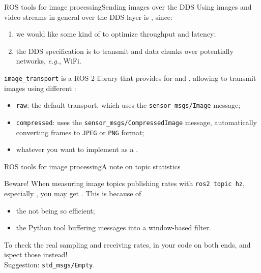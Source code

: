 \begin{frame}{ROS tools for image processing}{Sending images over the DDS}
  Using images and video streams in general over the DDS layer is , since:
  \begin{enumerate}
    \item we would like some kind of  to optimize throughput and latency;
    \item the DDS specification is  to transmit  and  data chunks over potentially  networks, \emph{e.g.}, WiFi.
  \end{enumerate}
  \texttt{image\_transport} is a ROS 2 library that provides  for  and , allowing to transmit images using different :
  \begin{itemize}
    \item \texttt{raw}: the default transport, which uses the \texttt{sensor\_msgs/Image} message;
    \item \texttt{compressed}: uses the \texttt{sensor\_msgs/CompressedImage} message, automatically converting frames to \texttt{JPEG} or \texttt{PNG} format;
    \item whatever you want to implement as a .
  \end{itemize}
\end{frame}
\begin{frame}{ROS tools for image processing}{A note on topic statistics}
  \begin{alertblock}{Beware!}
    When measuring image topics publishing rates with \texttt{ros2 topic hz}, especially , you may get . This is because of
    \begin{itemize}
      \item the  not being so efficient;
      \item the  Python tool buffering messages into a window-based filter.
    \end{itemize}
    To check the real sampling and receiving rates,  in your code on both ends, and ispect those instead!\\
    Suggestion: \texttt{std\_msgs/Empty}.
  \end{alertblock}
\end{frame}
